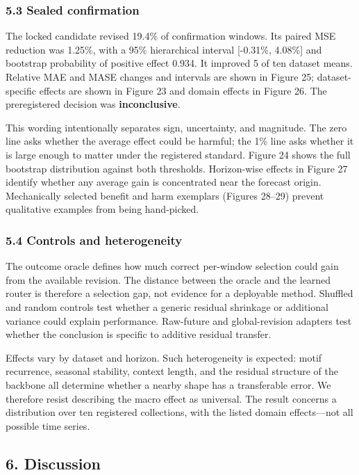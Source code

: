 \documentclass[
]{article}
\begin{document}
\subsubsection{5.3 Sealed confirmation}\label{53-sealed-confirmation}

The locked candidate revised 19.4\% of confirmation windows. Its paired
MSE reduction was 1.25\%, with a 95\% hierarchical interval {[}-0.31\%,
4.08\%{]} and bootstrap probability of positive effect 0.934. It
improved 5 of ten dataset means. Relative MAE and MASE changes and
intervals are shown in Figure 25; dataset-specific effects are shown in
Figure 23 and domain effects in Figure 26. The preregistered decision
was \textbf{inconclusive}.

This wording intentionally separates sign, uncertainty, and magnitude.
The zero line asks whether the average effect could be harmful; the 1\%
line asks whether it is large enough to matter under the registered
standard. Figure 24 shows the full bootstrap distribution against both
thresholds. Horizon-wise effects in Figure 27 identify whether any
average gain is concentrated near the forecast origin. Mechanically
selected benefit and harm exemplars (Figures 28--29) prevent qualitative
examples from being hand-picked.

\subsubsection{5.4 Controls and
heterogeneity}\label{54-controls-and-heterogeneity}

The outcome oracle defines how much correct per-window selection could
gain from the available revision. The distance between the oracle and
the learned router is therefore a selection gap, not evidence for a
deployable method. Shuffled and random controls test whether a generic
residual shrinkage or additional variance could explain performance.
Raw-future and global-revision adapters test whether the conclusion is
specific to additive residual transfer.

Effects vary by dataset and horizon. Such heterogeneity is expected:
motif recurrence, seasonal stability, context length, and the residual
structure of the backbone all determine whether a nearby shape has a
transferable error. We therefore resist describing the macro effect as
universal. The result concerns a distribution over ten registered
collections, with the listed domain effects---not all possible time
series.

\subsection{6. Discussion}\label{6-discussion}
\end{document}
